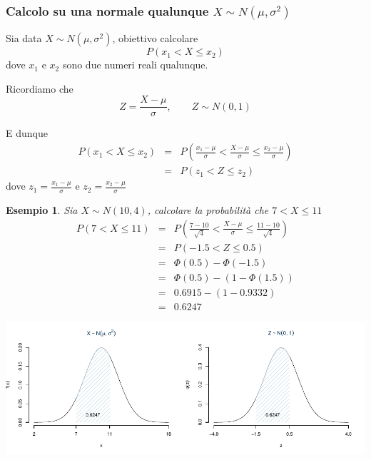 \documentclass[
  11pt,
]{book}
\theoremstyle{mytheoremstyle}
\theoremstyle{mydefstyle}
\newtheorem{example}{{Esempio}}[section]
\begin{document}
\subsubsection{\texorpdfstring{Calcolo su una normale qualunque \(X\sim N(\mu,\sigma^2)\)}{Calcolo su una normale qualunque X\textbackslash sim N(\textbackslash mu,\textbackslash sigma\^{}2)}}\label{calcolo-su-una-normale-qualunque-xsim-nmusigma2}

Sia data \(X\sim N(\mu,\sigma^2)\), obiettivo calcolare
\[P(x_1<X\leq x_2)\]
dove \(x_1\) e \(x_2\) sono due numeri reali qualunque.

Ricordiamo che
\[Z=\frac {X-\mu}\sigma,\qquad Z\sim N(0,1)\]

E dunque
\begin{eqnarray*}
P(x_1<X\leq x_2) &=& P\left( \frac {x_1 - \mu}\sigma < \frac {X - \mu}\sigma \leq \frac {x_2 - \mu}\sigma\right) \\
                  &=& P(z_1<Z\leq z_2)  
\end{eqnarray*}
dove \(z_1=\frac {x_1 - \mu}\sigma\) e \(z_2=\frac {x_2 - \mu}\sigma\)

\begin{example}

Sia \(X\sim N(10,4)\), calcolare la probabilità che \(7<X\leq 11\)
\begin{eqnarray*}
P(7<X\leq 11) &=& P\left( \frac {7 - 10}{\sqrt{4}} < \frac {X - \mu}\sigma \leq \frac {11 - 10}{\sqrt{4}}\right)  \\
              &=& P\left( -1.5 < Z \leq 0.5\right) \\
              &=& \Phi(0.5)-\Phi(-1.5)\\
              &=& \Phi(0.5)-(1-\Phi(1.5))\\
              &=& 0.6915-(1-0.9332)\\
              &=& 0.6247
\end{eqnarray*}

\begin{center}\includegraphics{Appunti_di_Statistica_2025_files/figure-latex/07c-Normale-26,-1} \end{center}

\end{example}
\end{document}
